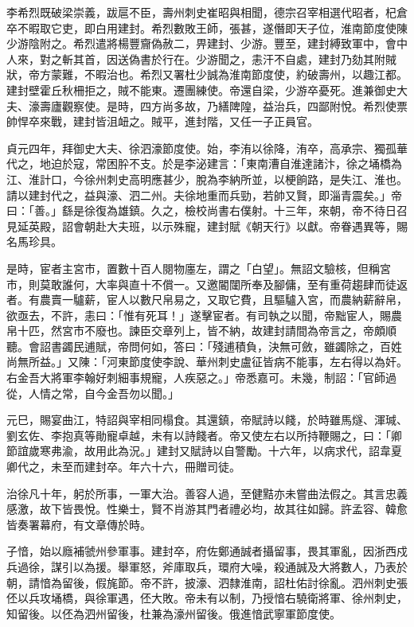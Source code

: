 \begin{pinyinscope}
 李希烈既破梁崇義，跋扈不臣，壽州刺史崔昭與相聞，德宗召宰相選代昭者，杞倉卒不暇取它吏，即白用建封。希烈數敗王師，張甚，遂僭即天子位，淮南節度使陳少游陰附之。希烈遣將楊豐齎偽赦二，畀建封、少游。豐至，建封縛致軍中，會中人來，對之斬其首，因送偽書於行在。少游聞之，恚汗不自處，建封乃劾其附賊狀，帝方蒙難，不暇治也。希烈又署杜少誠為淮南節度使，約破壽州，以趣江都。建封壁霍丘秋柵拒之，賊不能東。遷團練使。帝還自梁，少游卒憂死。進兼御史大夫、濠壽廬觀察使。是時，四方尚多故，乃繕陴隍，益治兵，四鄙附悅。希烈使票帥悍卒來戰，建封皆沮衄之。賊平，進封階，又任一子正員官。



 貞元四年，拜御史大夫、徐泗濠節度使。始，李洧以徐降，洧卒，高承宗、獨孤華代之，地迫於寇，常困肸不支。於是李泌建言：「東南漕自淮達諸汴，徐之埇橋為江、淮計口，今徐州刺史高明應甚少，脫為李納所並，以梗餉路，是失江、淮也。請以建封代之，益與濠、泗二州。夫徐地重而兵勁，若帥又賢，即淄青震矣。」帝曰：「善。」繇是徐復為雄鎮。久之，檢校尚書右僕射。十三年，來朝，帝不待日召見延英殿，詔會朝赴大夫班，以示殊寵，建封賦《朝天行》以獻。帝眷遇異等，賜名馬珍具。



 是時，宦者主宮市，置數十百人閱物廛左，謂之「白望」。無詔文驗核，但稱宮市，則莫敢誰何，大率與直十不償一。又邀閽闥所奉及腳傭，至有重荷趨肆而徒返者。有農賣一驢薪，宦人以數尺帛易之，又取它費，且驅驢入宮，而農納薪辭帛，欲亟去，不許，恚曰：「惟有死耳！」遂擊宦者。有司執之以聞，帝黜宦人，賜農帛十匹，然宮市不廢也。諫臣交章列上，皆不納，故建封請間為帝言之，帝頗順聽。會詔書蠲民逋賦，帝問何如，答曰：「殘逋積負，決無可斂，雖蠲除之，百姓尚無所益。」又陳：「河東節度使李說、華州刺史盧征皆病不能事，左右得以為奸。右金吾大將軍李翰好刺細事規寵，人疾惡之。」帝悉嘉可。未幾，制詔：「官師過從，人情之常，自今金吾勿以聞。」



 元巳，賜宴曲江，特詔與宰相同榻食。其還鎮，帝賦詩以餞，於時雖馬燧、渾瑊、劉玄佐、李抱真等勛寵卓越，未有以詩餞者。帝又使左右以所持鞭賜之，曰：「卿節誼歲寒弗渝，故用此為況。」建封又賦詩以自警勵。十六年，以病求代，詔韋夏卿代之，未至而建封卒。年六十六，冊贈司徒。



 治徐凡十年，躬於所事，一軍大治。善容人過，至健黠亦未嘗曲法假之。其言忠義感激，故下皆畏悅。性樂士，賢不肖游其門者禮必均，故其往如歸。許孟容、韓愈皆奏署幕府，有文章傳於時。



 子愔，始以廕補虢州參軍事。建封卒，府佐鄭通誠者攝留事，畏其軍亂，因浙西戍兵過徐，謀引以為援。舉軍怒，斧庫取兵，環府大噪，殺通誠及大將數人，乃表於朝，請愔為留後，假旄節。帝不許，披濠、泗隸淮南，詔杜佑討徐亂。泗州刺史張伾以兵攻埇橋，與徐軍遇，伾大敗。帝未有以制，乃授愔右驍衛將軍、徐州刺史，知留後。以伾為泗州留後，杜兼為濠州留後。俄進愔武寧軍節度使。




\end{pinyinscope}
